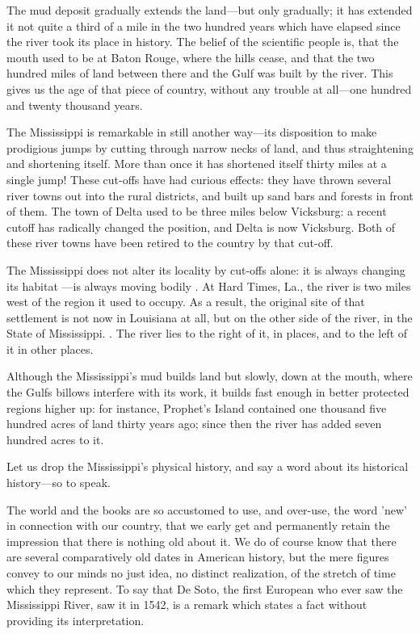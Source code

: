 \documentclass[../interior-demo.tex]{subfiles}
\begin{document}
The mud deposit gradually extends the land---but only gradually; it has
extended it not quite a third of a mile in the two hundred years which
have elapsed since the river took its place in history. The belief of
the scientific people is, that the mouth used to be at Baton Rouge,
where the hills cease, and that the two hundred miles of land between
there and the Gulf was built by the river. This gives us the age of that
piece of country, without any trouble at all---one hundred and twenty
thousand years.

The Mississippi is remarkable in still another way---its disposition to
make prodigious jumps by cutting through narrow necks of land, and thus
straightening and shortening itself. More than once it has shortened
itself thirty miles at a single jump! These cut-offs have had curious
effects: they have thrown several river towns out into the rural
districts, and built up sand bars and forests in front of them. The town
of Delta used to be three miles below Vicksburg: a recent cutoff has
radically changed the position, and Delta is now 
Vicksburg. Both of these river towns have been retired to the country by that
cut-off.

The Mississippi does not alter its locality by cut-offs alone: it
is always changing its habitat ---is always moving bodily
. At Hard Times, La., the river is two miles west of the
region it used to occupy. As a result, the original site of that
settlement is not now in Louisiana at all, but on the other side of
the river, in the State of Mississippi. . The river lies to the right of it, in places, and to the
left of it in other places.

Although the Mississippi's mud builds land but slowly, down at the
mouth, where the Gulfs billows interfere with its work, it builds fast
enough in better protected regions higher up: for instance, Prophet's
Island contained one thousand five hundred acres of land thirty years
ago; since then the river has added seven hundred acres to it.


Let us drop the Mississippi's physical history, and say a word about its
historical history---so to speak.

The world and the books are so accustomed to use, and over-use, the word
'new' in connection with our country, that we early get and permanently
retain the impression that there is nothing old about it. We do of
course know that there are several comparatively old dates in American
history, but the mere figures convey to our minds no just idea, no
distinct realization, of the stretch of time which they represent.
To say that De Soto, the first European who ever saw the Mississippi
River, saw it in 1542, is a remark which states a fact without
providing its interpretation.
\end{document}
